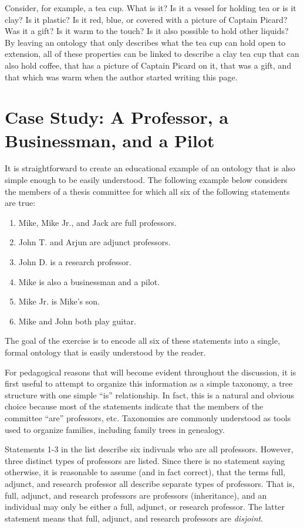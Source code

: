Consider, for example, a tea cup. What is it? Is it a vessel for holding tea or
is it clay? Is it plastic? Is it red, blue, or covered with a picture of
Captain Picard? Was it a gift? Is it warm to the touch? Is it also possible to
hold other liquids? By leaving an ontology that only describes what the tea cup
can hold open to extension, all of these properties can be linked to describe a
clay tea cup that can also hold coffee, that has a picture of Captain Picard on
it, that was a gift, and that which was warm when the author started writing
this page.

\section{Case Study: A Professor, a Businessman, and a Pilot}
\label{case-study}

It is straightforward to create an educational example of an ontology that is
also simple enough to be easily understood. The following example below
considers the members of a thesis committee for which all six of the following
statements are true:

\begin{enumerate}
\item Mike, Mike Jr., and Jack are full professors. %
\item John T. and Arjun are adjunct professors.     %
\item John D. is a research professor.              %
\item Mike is also a businessman and a pilot.       %
\item Mike Jr. is Mike's son.                       %
\item Mike and John both play guitar.               %
\end{enumerate}

The goal of the exercise is to encode all six of these statements into a single,
formal ontology that is easily understood by the reader.

For pedagogical reasons that will become evident throughout the discussion, it
is first useful to attempt to organize this information as a simple taxonomy, a
tree structure with one simple ``is'' relationship. In fact, this is a natural
and obvious choice because most of the statements indicate that the members of
the committee ``are'' professors, etc. Taxonomies are commonly understood as
tools used to organize families, including family trees in genealogy.

Statements 1-3 in the list describe six indivuals who are all professors.
However, three distinct types of professors are listed. Since there is no
statement saying otherwise, it is reasonable to assume (and in fact correct),
that the terms full, adjunct, and research professor all describe separate types
of professors. That is, full, adjunct, and research professors are professors
(inheritance), and an individual may only be either a full, adjunct, or research
professor. The latter statement means that full, adjunct, and research
professors are \textit{disjoint}. 

